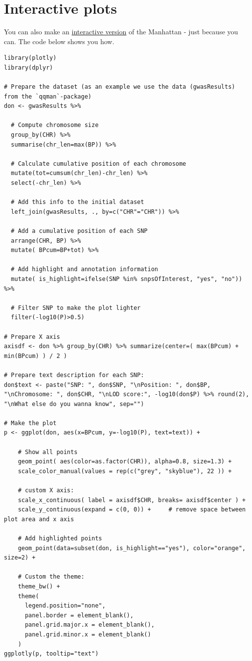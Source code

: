 \documentclass[
]{book}
\begin{document}
\hypertarget{interactive-plots}{%
\section{Interactive plots}\label{interactive-plots}}

You can also make an \href{https://r-graph-gallery.com/101_Manhattan_plot.html}{interactive version} of the Manhattan - just because you can. The code below shows you how.

\begin{lstlisting}
library(plotly)
library(dplyr)

# Prepare the dataset (as an example we use the data (gwasResults) from the `qqman`-package)
don <- gwasResults %>%

  # Compute chromosome size
  group_by(CHR) %>%
  summarise(chr_len=max(BP)) %>%

  # Calculate cumulative position of each chromosome
  mutate(tot=cumsum(chr_len)-chr_len) %>%
  select(-chr_len) %>%

  # Add this info to the initial dataset
  left_join(gwasResults, ., by=c("CHR"="CHR")) %>%

  # Add a cumulative position of each SNP
  arrange(CHR, BP) %>%
  mutate( BPcum=BP+tot) %>%

  # Add highlight and annotation information
  mutate( is_highlight=ifelse(SNP %in% snpsOfInterest, "yes", "no")) %>%

  # Filter SNP to make the plot lighter
  filter(-log10(P)>0.5)

# Prepare X axis
axisdf <- don %>% group_by(CHR) %>% summarize(center=( max(BPcum) + min(BPcum) ) / 2 )

# Prepare text description for each SNP:
don$text <- paste("SNP: ", don$SNP, "\nPosition: ", don$BP, "\nChromosome: ", don$CHR, "\nLOD score:", -log10(don$P) %>% round(2), "\nWhat else do you wanna know", sep="")

# Make the plot
p <- ggplot(don, aes(x=BPcum, y=-log10(P), text=text)) +

    # Show all points
    geom_point( aes(color=as.factor(CHR)), alpha=0.8, size=1.3) +
    scale_color_manual(values = rep(c("grey", "skyblue"), 22 )) +

    # custom X axis:
    scale_x_continuous( label = axisdf$CHR, breaks= axisdf$center ) +
    scale_y_continuous(expand = c(0, 0)) +     # remove space between plot area and x axis

    # Add highlighted points
    geom_point(data=subset(don, is_highlight=="yes"), color="orange", size=2) +

    # Custom the theme:
    theme_bw() +
    theme(
      legend.position="none",
      panel.border = element_blank(),
      panel.grid.major.x = element_blank(),
      panel.grid.minor.x = element_blank()
    )
ggplotly(p, tooltip="text")
\end{lstlisting}
\end{document}
